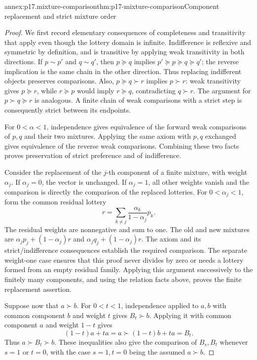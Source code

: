 \begin{annexitem}{annex:p17.mixture-comparison}{thm:p17-mixture-comparison}{Component replacement and strict mixture order}
\begin{proof}
We first record elementary consequences of completeness and transitivity
that apply even though the lottery domain is infinite. Indifference is
reflexive and symmetric by definition, and is transitive by applying weak
transitivity in both directions. If \(p\sim p'\) and \(q\sim q'\),
then \(p\succeq q\) implies \(p'\succeq p\succeq q\succeq q'\);
the reverse implication is the same chain in the other direction.
Thus replacing indifferent objects preserves comparisons. Also,
\(p\succeq q\succ r\) implies \(p\succ r\): weak transitivity gives
\(p\succeq r\), while \(r\succeq p\) would imply
\(r\succeq q\), contradicting \(q\succ r\). The argument for
\(p\succ q\succeq r\) is analogous. A finite chain of weak comparisons
with a strict step is consequently strict between its endpoints.

For \(0<\alpha<1\), independence gives equivalence of the forward
weak comparisons of \(p,q\) and their two mixtures. Applying the same
axiom with \(p,q\) exchanged gives equivalence of the reverse weak
comparisons. Combining these two facts proves preservation of strict
preference and of indifference.

Consider the replacement of the \(j\)-th component of a finite mixture,
with weight \(\alpha_j\). If \(\alpha_j=0\), the vector is unchanged.
If \(\alpha_j=1\), all other weights vanish and the comparison is
directly the comparison of the replaced lotteries. For
\(0<\alpha_j<1\), form the common residual lottery
\[
             r=\sum_{k\ne j}\frac{\alpha_k}{1-\alpha_j}p_k.
\]
The residual weights are nonnegative and sum to one. The old and new
mixtures are \(\alpha_jp_j+(1-\alpha_j)r\) and
\(\alpha_jq_j+(1-\alpha_j)r\). The axiom and its strict/indifference
consequences establish the required comparison. The separate weight-one
case ensures that this proof never divides by zero or needs a lottery
formed from an empty residual family. Applying this argument successively
to the finitely many components, and using the relation facts above,
proves the finite replacement assertion.

Suppose now that \(a\succ b\). For \(0<t<1\), independence applied
to \(a,b\) with common component \(b\) and weight \(t\) gives
\(B_t\succ b\). Applying it with common component \(a\) and weight
\(1-t\) gives
\[
 (1-t)a+ta=a\succ(1-t)b+ta=B_t.
\]
Thus \(a\succ B_t\succ b\). These inequalities also give the
comparison of \(B_s,B_t\) whenever \(s=1\) or \(t=0\), with
the case \(s=1,t=0\) being the assumed \(a\succ b\).


\end{proof}
\end{annexitem}
